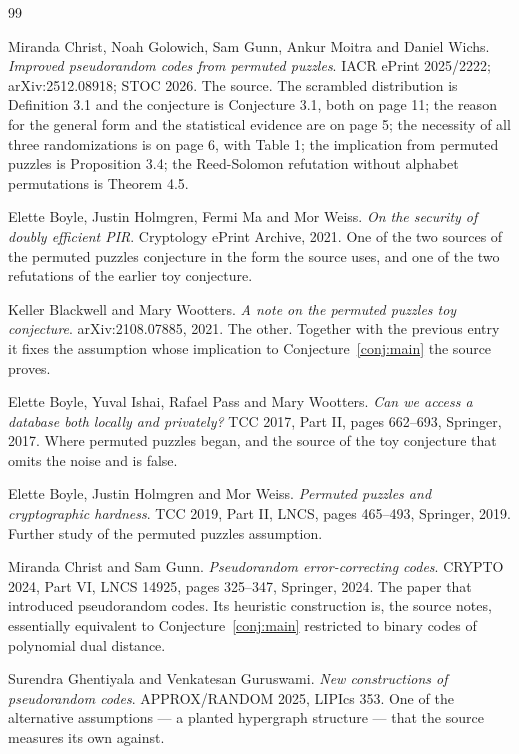 \documentclass{aicr-conjecture}
\begin{document}
\begin{aicrbibliography}{99}

Miranda Christ, Noah Golowich, Sam Gunn, Ankur Moitra and Daniel Wichs.
\emph{Improved pseudorandom codes from permuted puzzles}.
IACR ePrint 2025/2222; arXiv:2512.08918; STOC 2026.
The source. The scrambled distribution is Definition 3.1 and the
conjecture is Conjecture 3.1, both on page 11; the reason for the general
form and the statistical evidence are on page 5; the necessity of all
three randomizations is on page 6, with Table 1; the implication from
permuted puzzles is Proposition 3.4; the Reed-Solomon refutation without
alphabet permutations is Theorem 4.5.

Elette Boyle, Justin Holmgren, Fermi Ma and Mor Weiss.
\emph{On the security of doubly efficient PIR}.
Cryptology ePrint Archive, 2021.
One of the two sources of the permuted puzzles conjecture in the form the
source uses, and one of the two refutations of the earlier toy conjecture.

Keller Blackwell and Mary Wootters.
\emph{A note on the permuted puzzles toy conjecture}.
arXiv:2108.07885, 2021.
The other. Together with the previous entry it fixes the assumption whose
implication to Conjecture~\ref{conj:main} the source proves.

Elette Boyle, Yuval Ishai, Rafael Pass and Mary Wootters.
\emph{Can we access a database both locally and privately?}
TCC 2017, Part II, pages 662--693, Springer, 2017.
Where permuted puzzles began, and the source of the toy conjecture that
omits the noise and is false.

Elette Boyle, Justin Holmgren and Mor Weiss.
\emph{Permuted puzzles and cryptographic hardness}.
TCC 2019, Part II, LNCS, pages 465--493, Springer, 2019.
Further study of the permuted puzzles assumption.

Miranda Christ and Sam Gunn.
\emph{Pseudorandom error-correcting codes}.
CRYPTO 2024, Part VI, LNCS 14925, pages 325--347, Springer, 2024.
The paper that introduced pseudorandom codes. Its heuristic construction
is, the source notes, essentially equivalent to
Conjecture~\ref{conj:main} restricted to binary codes of polynomial dual
distance.

Surendra Ghentiyala and Venkatesan Guruswami.
\emph{New constructions of pseudorandom codes}.
APPROX/RANDOM 2025, LIPIcs 353.
One of the alternative assumptions --- a planted hypergraph structure ---
that the source measures its own against.

\end{aicrbibliography}
\end{document}
